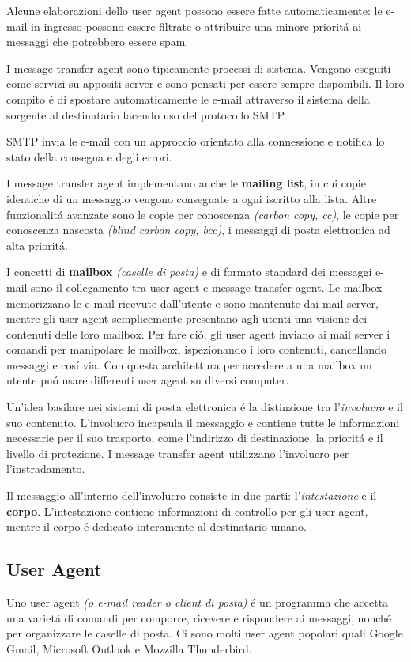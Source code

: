 \documentclass[12pt]{article}
\begin{document}
Alcune elaborazioni dello user agent possono essere fatte automaticamente: le e-mail in ingresso possono essere filtrate o attribuire 
una minore priorit\'a ai messaggi che potrebbero essere spam.

I message transfer agent sono tipicamente processi di sistema. Vengono eseguiti come servizi su appositi server e sono pensati per 
essere sempre disponibili. Il loro compito \'e di spostare automaticamente  le e-mail attraverso il sistema della sorgente al 
destinatario facendo uso del protocollo SMTP.

SMTP invia le e-mail con un approccio orientato alla connessione e notifica lo stato della consegna e degli errori.

I message transfer agent implementano anche le \textbf{mailing list}, in cui copie identiche di un messaggio vengono consegnate a ogni 
iscritto alla lista. Altre funzionalit\'a avanzate sono le copie per conoscenza \textit{(carbon copy, cc)}, le copie per conoscenza 
nascosta \textit{(blind carbon copy, bcc)}, i messaggi di posta elettronica ad alta priorit\'a.

I concetti di \textbf{mailbox} \textit{(caselle di posta)} e di formato standard dei messaggi e-mail sono il collegamento tra user 
agent e message transfer agent. Le mailbox memorizzano le e-mail ricevute dall'utente e sono mantenute dai mail server, mentre gli 
user agent semplicemente presentano agli utenti una visione  dei contenuti delle loro mailbox. Per fare ci\'o, gli user agent inviano 
ai mail server i comandi per manipolare le mailbox, ispezionando i loro contenuti, cancellando messaggi e cos\'i via. Con questa 
architettura per accedere a una mailbox un utente pu\'o usare differenti user agent su diversi computer.

Un'idea basilare nei sistemi di posta elettronica \'e la distinzione tra l'\textit{involucro} e il suo contenuto. L'involucro 
incapsula il messaggio e contiene tutte le informazioni necessarie per il suo trasporto, come l'indirizzo di destinazione, la 
priorit\'a e il livello di protezione. I message transfer agent utilizzano l'involucro per l'instradamento.

Il messaggio all'interno dell'involucro consiste in due parti: l'\textit{intestazione} e il \textbf{corpo}. L'intestazione contiene 
informazioni di controllo per gli user agent, mentre il corpo \'e dedicato interamente al destinatario umano.

\subsection{User Agent}\label{posta-elettronica-user-agent}
Uno user agent \textit{(o e-mail reader o client di posta)} \'e un programma che accetta una variet\'a di comandi per comporre, 
ricevere e rispondere ai messaggi, nonch\'e per organizzare le caselle di posta. Ci sono molti user agent popolari quali Google 
Gmail, Microsoft Outlook e Mozzilla Thunderbird.
\end{document}

